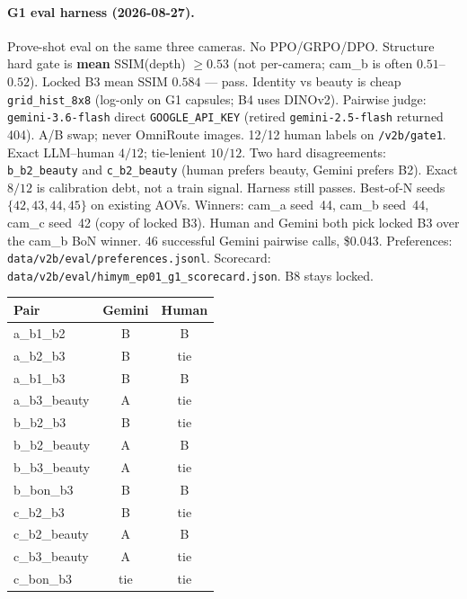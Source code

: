 \documentclass[10pt,twocolumn,letterpaper]{article}
\begin{document}
\paragraph{G1 eval harness (2026-08-27).}
Prove-shot eval on the same three cameras. No PPO/GRPO/DPO.
Structure hard gate is \textbf{mean} SSIM(depth) $\ge 0.53$ (not per-camera; cam\_b is often $0.51$--$0.52$). Locked B3 mean SSIM $0.584$ --- pass.
Identity vs beauty is cheap \texttt{grid\_hist\_8x8} (log-only on G1 capsules; B4 uses DINOv2).
Pairwise judge: \texttt{gemini-3.6-flash} direct \texttt{GOOGLE\_API\_KEY} (retired \texttt{gemini-2.5-flash} returned 404). A/B swap; never OmniRoute images.
12/12 human labels on \texttt{/v2b/gate1}. Exact LLM--human $4/12$; tie-lenient $10/12$. Two hard disagreements: \texttt{b\_b2\_beauty} and \texttt{c\_b2\_beauty} (human prefers beauty, Gemini prefers B2). Exact $8/12$ is calibration debt, not a train signal. Harness still passes.
Best-of-N seeds $\{42,43,44,45\}$ on existing AOVs. Winners: cam\_a seed~44, cam\_b seed~44, cam\_c seed~42 (copy of locked B3). Human and Gemini both pick locked B3 over the cam\_b BoN winner.
46 successful Gemini pairwise calls, \$0.043. Preferences: \texttt{data/v2b/eval/preferences.jsonl}. Scorecard: \texttt{data/v2b/eval/himym\_ep01\_g1\_scorecard.json}. B8 stays locked.

\begin{center}
\small
\begin{tabular}{lcc}
\toprule
Pair & Gemini & Human \\
\midrule
a\_b1\_b2 & B & B \\
a\_b2\_b3 & B & tie \\
a\_b1\_b3 & B & B \\
a\_b3\_beauty & A & tie \\
b\_b2\_b3 & B & tie \\
b\_b2\_beauty & A & B \\
b\_b3\_beauty & A & tie \\
b\_bon\_b3 & B & B \\
c\_b2\_b3 & B & tie \\
c\_b2\_beauty & A & B \\
c\_b3\_beauty & A & tie \\
c\_bon\_b3 & tie & tie \\
\bottomrule
\end{tabular}
\end{center}
\end{document}
